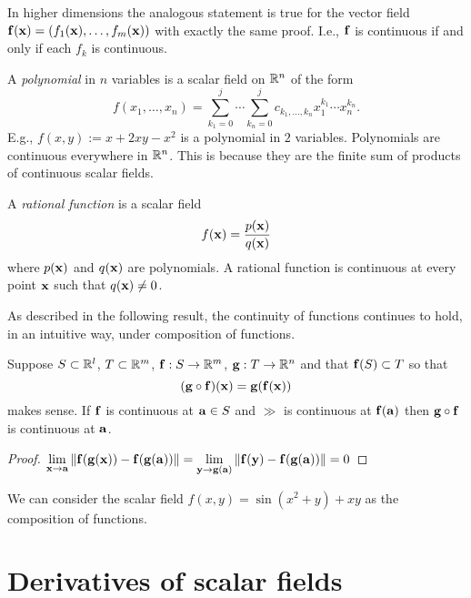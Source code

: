 In higher dimensions the analogous statement is true for the vector field \(\ff(\xx) = \left(f_1(\xx),\ldots,f_m(\xx) \right)\) with exactly the same proof.
I.e., \(\ff\) is continuous if and only if each \(f_k\) is continuous.


\begin{example*}[polynomials]
    A  \emph{polynomial} in \(n\) variables is a scalar field on \(\bR^n\) of the form
    \[
        f(x_1,\ldots,x_n)
        = \sum_{k_1=0}^{j}\cdots \sum_{k_n=0}^{j} c_{k_1,\dots,k_n} x_1^{k_1}\cdots x_n^{k_n}.
    \]
    E.g., \(f(x,y):= x + 2x y - x^2\) is a polynomial in \(2\) variables.
    Polynomials are continuous everywhere in \(\bR^n\). This is because they are the finite sum of products of continuous scalar fields.
\end{example*}

\begin{example*}
    A  \emph{rational function} is a scalar field
    \[
        f(\xx)=\frac{p(\xx)}{q(\xx)}
    \]
    where \(p(\xx)\) and \(q(\xx)\) are polynomials.
    A rational function is continuous at every point \(\xx\) such that \(q(\xx)\neq 0\).
\end{example*}

As described in the following result, the continuity of functions continues to hold, in an intuitive way, under composition of functions.

\begin{theorem}
    Suppose \(S \subset \bR^l\), \(T\subset \bR^m\), \(\ff:S \to \bR^m\), \(\gg : T \to \bR^n\) and that \(\ff(S) \subset T\) so that
    \[(\gg \circ \ff)(\xx) = \gg(\ff(\xx))\]
    makes sense.
    If \(\ff\) is continuous at \(\aa\in S\) and \(\gg\) is continuous at \(\ff(\aa)\) then \(\gg\circ \ff\) is continuous at \(\aa\).
\end{theorem}

\begin{proof}
    \(\displaystyle\lim_{\xx\to\aa}\norm{\ff(\gg(\xx))-\ff(\gg(\aa))}  =\displaystyle\lim_{\yy\to\gg(\aa)}\norm{\ff(\yy)-\ff(\gg(\aa))}  =0   \)
\end{proof}

\begin{example*}
    We can consider the scalar field \(f(x,y)= \sin(x^2 + y) + x y\) as the composition of functions.
\end{example*}


\section{Derivatives of scalar fields}


